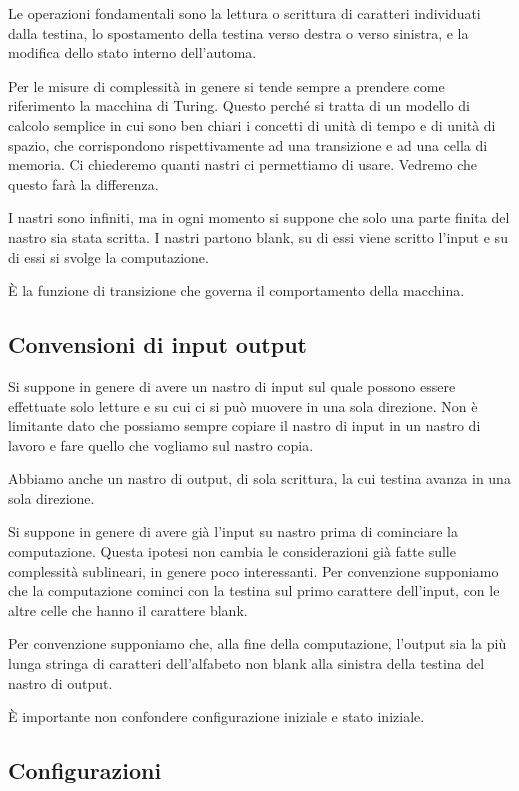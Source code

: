 Le operazioni fondamentali sono la lettura o scrittura di caratteri individuati dalla testina, lo
spostamento della testina verso destra o verso sinistra, e la modifica dello stato interno
dell'automa.

Per le misure di complessità in genere si tende sempre a prendere come riferimento la macchina di
Turing. Questo perché si tratta di un modello di calcolo semplice in cui sono ben chiari i concetti
di unità di tempo e di unità di spazio, che corrispondono rispettivamente ad una transizione e ad
una cella di memoria.  Ci chiederemo quanti nastri ci permettiamo di usare. Vedremo che questo farà
la differenza.

I nastri sono infiniti, ma in ogni momento si suppone che solo una parte finita del nastro sia stata
scritta. I nastri partono blank, su di essi viene scritto l'input e su di essi si svolge la
computazione.

È la funzione di transizione che governa il comportamento della macchina.

\subsection{Convensioni di input output}


Si suppone in genere di avere un nastro di input sul quale possono essere effettuate solo letture e
su cui ci si può muovere in una sola direzione. Non è limitante dato che possiamo sempre copiare il
nastro di input in un nastro di lavoro e fare quello che vogliamo sul nastro copia.

Abbiamo anche un nastro di output, di sola scrittura, la cui testina avanza in una sola direzione.

Si suppone in genere di avere già l'input su nastro prima di cominciare la computazione.  Questa
ipotesi non cambia le considerazioni già fatte sulle complessità sublineari, in genere poco
interessanti. Per convenzione supponiamo che la computazione cominci con la testina sul primo
carattere dell'input, con le altre celle che hanno il carattere blank.

Per convenzione supponiamo che, alla fine della computazione, l'output sia la più lunga stringa di
caratteri dell'alfabeto non blank alla sinistra della testina del nastro di output.

È importante non confondere configurazione iniziale e stato iniziale.

\subsection{Configurazioni}


